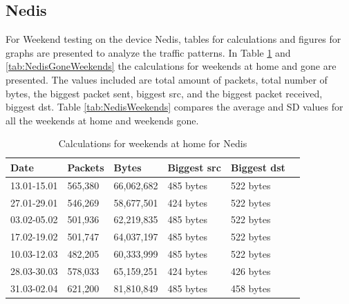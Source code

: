\newpage
\subsection{Nedis}
For Weekend testing on the device Nedis, tables for calculations and figures for graphs are presented to analyze the traffic patterns. In Table \ref{tab:NedisHomeWeekends} and \ref{tab:NedisGoneWeekends} the calculations for weekends at home and gone are presented. The values included are total amount of packets, total number of bytes, the biggest packet sent, biggest src, and the biggest packet received, biggest dst. Table \ref{tab:NedisWeekends} compares the average and \gls{SD} values for all the weekends at home and weekends gone.

\begin{table}[H]
    \centering
    \caption{Calculations for weekends at home for Nedis}
    \begin{tabular}{|l|l|l|l|l|l|}
        \hline
        \textbf{Date}    & \textbf{Packets} & \textbf{Bytes} & \textbf{Biggest src} & \textbf{Biggest dst} \\ \hline
        13.01-15.01      & 565,380            & 66,062,682           & 485 bytes            & 522 bytes            \\ \hline
        27.01-29.01      & 546,269            & 58,677,501           & 424 bytes            & 522 bytes            \\ \hline
        03.02-05.02      & 501,936            & 62,219,835           & 485 bytes            &    522 bytes            \\ \hline
        17.02-19.02      & 501,747            & 64,037,197           & 485 bytes            & 522 bytes            \\ \hline
        10.03-12.03      & 482,205            & 60,333,999           & 485 bytes            & 522 bytes            \\ \hline
        28.03-30.03      & 578,033            & 65,159,251           & 424 bytes            & 426 bytes            \\ \hline
        31.03-02.04      & 621,200            & 81,810,849           & 485 bytes            & 458 bytes            \\ \hline
    \end{tabular}
    \label{tab:NedisHomeWeekends}
\end{table}

